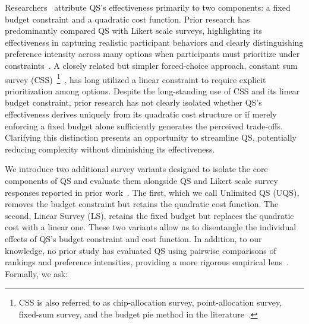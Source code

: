 
Researchers~\cite{chengCanShowWhat2021, cavaille2024cares} attribute QS's effectiveness primarily to two components: a fixed budget constraint and a quadratic cost function. Prior research has predominantly compared QS with Likert scale surveys, highlighting its effectiveness in capturing realistic participant behaviors and clearly distinguishing preference intensity across many options when participants must prioritize under constraints~\cite{chengCanShowWhat2021, cavaille2024cares}. A closely related but simpler forced-choice approach, constant sum survey (CSS)~\footnote{CSS is also referred to as chip-allocation survey, point-allocation survey, fixed-sum survey, and the budget pie method in the literature~\cite{harwoodUnderstandingImplicitExplicit2019, thomas2004using, robertsWeightApproximationsMultiattribute2002, zhuSelfestimationWeightParameter1991, mciverUsingBudgetPies1976, toepoelSmileysStarsHearts2019}.}~\cite{metfesselProposalQuantitativeReporting1947}, has long utilized a linear constraint to require explicit prioritization among options. Despite the long-standing use of CSS and its linear budget constraint, prior research has not clearly isolated whether QS's effectiveness derives uniquely from its quadratic cost structure or if merely enforcing a fixed budget alone sufficiently generates the perceived trade-offs. Clarifying this distinction presents an opportunity to streamline QS, potentially reducing complexity without diminishing its effectiveness.


We introduce two additional survey variants designed to isolate the core components of QS and evaluate them alongside QS and Likert scale survey responses reported in prior work~\cite{chengCanShowWhat2021}. The first, which we call Unlimited QS (UQS), removes the budget constraint but retains the quadratic cost function. The second, Linear Survey (LS), retains the fixed budget but replaces the quadratic cost with a linear one. These two variants allow us to disentangle the individual effects of QS's budget constraint and cost function. In addition, to our knowledge, no prior study has evaluated QS using pairwise comparisons of rankings and preference intensities, providing a more rigorous empirical lens~\cite{collewet2023preference}. Formally, we ask:

